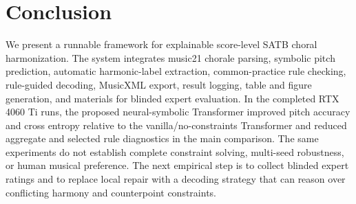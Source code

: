 \section{Conclusion}

We present a runnable framework for explainable score-level SATB choral harmonization. The system integrates music21 chorale parsing, symbolic pitch prediction, automatic harmonic-label extraction, common-practice rule checking, rule-guided decoding, MusicXML export, result logging, table and figure generation, and materials for blinded expert evaluation. In the completed RTX 4060 Ti runs, the proposed neural-symbolic Transformer improved pitch accuracy and cross entropy relative to the vanilla/no-constraints Transformer and reduced aggregate and selected rule diagnostics in the main comparison. The same experiments do not establish complete constraint solving, multi-seed robustness, or human musical preference. The next empirical step is to collect blinded expert ratings and to replace local repair with a decoding strategy that can reason over conflicting harmony and counterpoint constraints.
